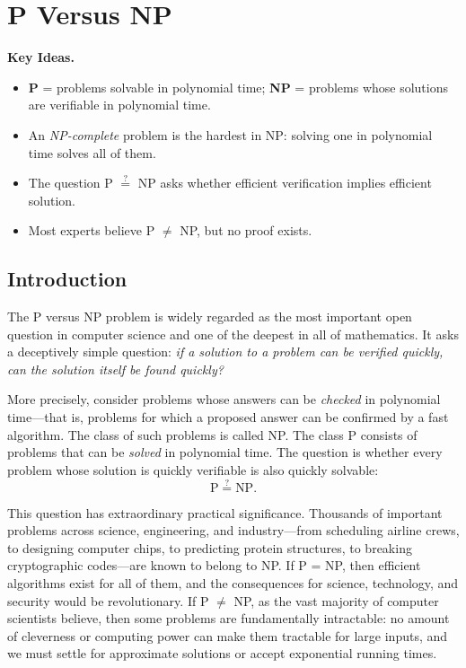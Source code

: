 \chapter{P Versus NP}
\label{ch:pvsnp}

\noindent\textbf{Key Ideas.}
\begin{itemize}
  \item \textbf{P} = problems solvable in polynomial time; \textbf{NP} = problems whose solutions are verifiable in polynomial time.
  \item An \emph{NP-complete} problem is the hardest in NP: solving one in polynomial time solves all of them.
  \item The question P $\stackrel{?}{=}$ NP asks whether efficient verification implies efficient solution.
  \item Most experts believe P $\neq$ NP, but no proof exists.
\end{itemize}

\bigskip

\section{Introduction}

The P versus NP problem is widely regarded as the most important open question in computer science and one of the deepest in all of mathematics. It asks a deceptively simple question: \emph{if a solution to a problem can be verified quickly, can the solution itself be found quickly?}

More precisely, consider problems whose answers can be \emph{checked} in polynomial time---that is, problems for which a proposed answer can be confirmed by a fast algorithm. The class of such problems is called NP. The class P consists of problems that can be \emph{solved} in polynomial time. The question is whether every problem whose solution is quickly verifiable is also quickly solvable:
\[
\text{P} \stackrel{?}{=} \text{NP}.
\]

This question has extraordinary practical significance. Thousands of important problems across science, engineering, and industry---from scheduling airline crews, to designing computer chips, to predicting protein structures, to breaking cryptographic codes---are known to belong to NP. If P = NP, then efficient algorithms exist for all of them, and the consequences for science, technology, and security would be revolutionary. If P $\neq$ NP, as the vast majority of computer scientists believe, then some problems are fundamentally intractable: no amount of cleverness or computing power can make them tractable for large inputs, and we must settle for approximate solutions or accept exponential running times.

